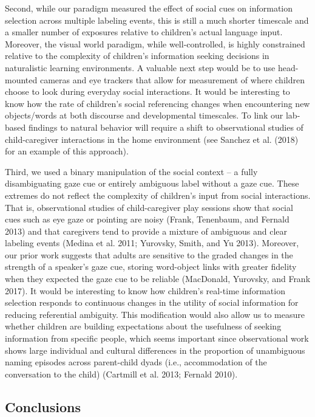 \documentclass[10pt, letterpaper]{article}
\begin{document}
Second, while our paradigm measured the effect of social cues on
information selection across multiple labeling events, this is still a
much shorter timescale and a smaller number of exposures relative to
children's actual language input. Moreover, the visual world paradigm,
while well-controlled, is highly constrained relative to the complexity
of children's information seeking decisions in naturalistic learning
environments. A valuable next step would be to use head-mounted cameras
and eye trackers that allow for measurement of where children choose to
look during everyday social interactions. It would be interesting to
know how the rate of children's social referencing changes when
encountering new objects/words at both discourse and developmental
timescales. To link our lab-based findings to natural behavior will
require a shift to observational studies of child-caregiver interactions
in the home environment (see Sanchez et al. (2018) for an example of
this approach).

Third, we used a binary manipulation of the social context -- a fully
disambiguating gaze cue or entirely ambiguous label without a gaze cue.
These extremes do not reflect the complexity of children's input from
social interactions. That is, observational studies of child-caregiver
play sessions show that social cues such as eye gaze or pointing are
noisy (Frank, Tenenbaum, and Fernald 2013) and that caregivers tend to
provide a mixture of ambiguous and clear labeling events (Medina et al.
2011; Yurovsky, Smith, and Yu 2013). Moreover, our prior work suggests
that adults are sensitive to the graded changes in the strength of a
speaker's gaze cue, storing word-object links with greater fidelity when
they expected the gaze cue to be reliable (MacDonald, Yurovsky, and
Frank 2017). It would be interesting to know how children's real-time
information selection responds to continuous changes in the utility of
social information for reducing referential ambiguity. This modification
would also allow us to measure whether children are building
expectations about the usefulness of seeking information from specific
people, which seems important since observational work shows large
individual and cultural differences in the proportion of unambiguous
naming episodes across parent-child dyads (i.e., accommodation of the
conversation to the child) (Cartmill et al. 2013; Fernald 2010).

\hypertarget{conclusions}{%
\subsection{Conclusions}\label{conclusions}}
\end{document}

